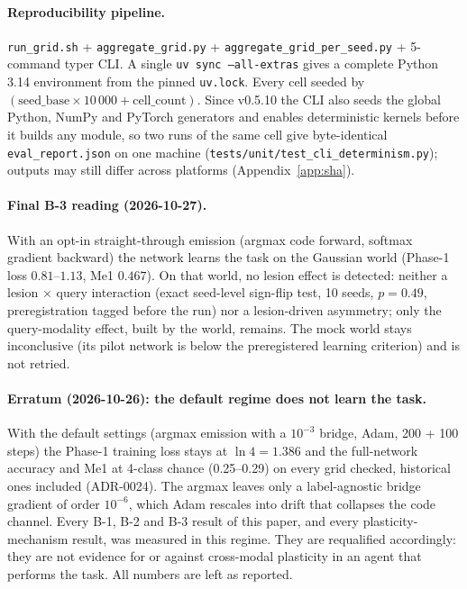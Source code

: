 \documentclass{article}
\begin{document}
\paragraph{Reproducibility pipeline.}
\texttt{run\_grid.sh} + \texttt{aggregate\_grid.py} +
\texttt{aggregate\_grid\_per\_seed.py} + 5-command typer CLI. A
single \texttt{uv sync --all-extras} gives a complete Python 3.14
environment from the pinned \texttt{uv.lock}. Every cell seeded by
$(\mathrm{seed\_base} \times 10\,000 + \mathrm{cell\_count})$.
Since v0.5.10 the CLI also seeds the global Python, NumPy and
PyTorch generators and enables deterministic kernels before it
builds any module, so two runs of the same cell give byte-identical
\texttt{eval\_report.json} on one machine
(\texttt{tests/unit/test\_cli\_determinism.py}); outputs may still
differ across platforms (Appendix~\ref{app:sha}).

\paragraph{Final B-3 reading (2026-10-27).} With an opt-in
straight-through emission (argmax code forward, softmax gradient
backward) the network learns the task on the Gaussian world (Phase-1
loss $0.81$--$1.13$, Me1 $0.467$). On that world, no lesion effect is
detected: neither a lesion $\times$ query interaction (exact seed-level
sign-flip test, 10 seeds, $p = 0.49$, preregistration tagged before the
run) nor a lesion-driven asymmetry; only the query-modality effect,
built by the world, remains. The mock world stays inconclusive (its
pilot network is below the preregistered learning criterion) and is not
retried.

\paragraph{Erratum (2026-10-26): the default regime does not learn the
task.} With the default settings (argmax emission with a $10^{-3}$
bridge, Adam, 200 + 100 steps) the Phase-1 training loss stays at
$\ln 4 = 1.386$ and the full-network accuracy and Me1 at 4-class chance
(0.25--0.29) on every grid checked, historical ones included (ADR-0024).
The argmax leaves only a label-agnostic bridge gradient of order
$10^{-6}$, which Adam rescales into drift that collapses the code
channel. Every B-1, B-2 and B-3 result of this paper, and every
plasticity-mechanism result, was measured in this regime. They are
requalified accordingly: they are not evidence for or against
cross-modal plasticity in an agent that performs the task. All
numbers are left as reported.
\end{document}
